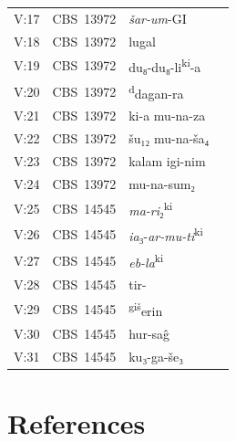 \documentclass[
]{book}
\begin{document}
\begin{longtable}[]{@{}llll@{}}
\toprule\noalign{}
\endhead
\bottomrule\noalign{}
\endlastfoot
V:17 & CBS~13972 & \emph{šar-um}-GI & \\
V:18 & CBS~13972 & lugal & \\
V:19 & CBS~13972 & du₈-du₈-li\textsuperscript{ki}-a & \\
V:20 & CBS~13972 & \textsuperscript{d}dagan-ra & \\
V:21 & CBS~13972 & ki-a mu-na-za & \\
V:22 & CBS~13972 & šu₁₂ mu-na-ša₄ & \\
V:23 & CBS~13972 & kalam igi-nim & \\
V:24 & CBS~13972 & mu-na-sum₂ & \\
V:25 & CBS~14545 & \emph{ma-ri}₂\textsuperscript{ki} & \\
V:26 & CBS~14545 & \emph{ia}₃-\emph{ar-mu-ti}\textsuperscript{ki} & \\
V:27 & CBS~14545 & \emph{eb-la}\textsuperscript{ki} & \\
V:28 & CBS~14545 & tir- & \\
V:29 & CBS~14545 & \textsuperscript{giš}erin & \\
V:30 & CBS~14545 & hur-saĝ & \\
V:31 & CBS~14545 & ku₃-ga-še₃ & \\
\end{longtable}

\hypertarget{references}{%
\chapter*{References}\label{references}}
\end{document}
